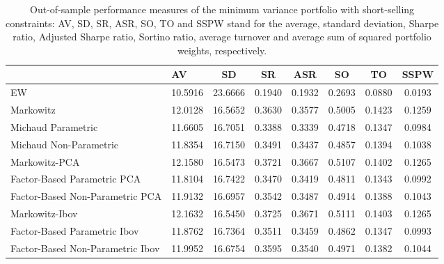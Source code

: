 \begin{table}

\caption{\label{tab:empirical_mvp}Out-of-sample performance measures of the minimum variance portfolio with short-selling constraints: AV, SD, SR, ASR, SO, TO and SSPW stand for the average, standard deviation, Sharpe ratio, Adjusted Sharpe ratio, Sortino ratio, average turnover and average sum of squared portfolio weights, respectively.}
\centering
\begin{tabular}[t]{l|l|c|c|c|c|c|c}
\hline
  & AV & SD & SR & ASR & SO & TO & SSPW\\
\hline
EW & 10.5916 & 23.6666 & 0.1940 & 0.1932 & 0.2693 & 0.0880 & 0.0193\\
\hline
Markowitz & 12.0128 & 16.5652 & 0.3630 & 0.3577 & 0.5005 & 0.1423 & 0.1259\\
\hline
Michaud Parametric & 11.6605 & 16.7051 & 0.3388 & 0.3339 & 0.4718 & 0.1347 & 0.0984\\
\hline
Michaud Non-Parametric & 11.8354 & 16.7150 & 0.3491 & 0.3437 & 0.4857 & 0.1394 & 0.1038\\
\hline
Markowitz-PCA & 12.1580 & 16.5473 & 0.3721 & 0.3667 & 0.5107 & 0.1402 & 0.1265\\
\hline
Factor-Based Parametric PCA & 11.8104 & 16.7422 & 0.3470 & 0.3419 & 0.4811 & 0.1343 & 0.0992\\
\hline
Factor-Based Non-Parametric PCA & 11.9132 & 16.6957 & 0.3542 & 0.3487 & 0.4914 & 0.1388 & 0.1043\\
\hline
Markowitz-Ibov & 12.1632 & 16.5450 & 0.3725 & 0.3671 & 0.5111 & 0.1403 & 0.1265\\
\hline
Factor-Based Parametric Ibov & 11.8762 & 16.7364 & 0.3511 & 0.3459 & 0.4862 & 0.1347 & 0.0993\\
\hline
Factor-Based Non-Parametric Ibov & 11.9952 & 16.6754 & 0.3595 & 0.3540 & 0.4971 & 0.1382 & 0.1044\\
\hline
\end{tabular}
\end{table}
